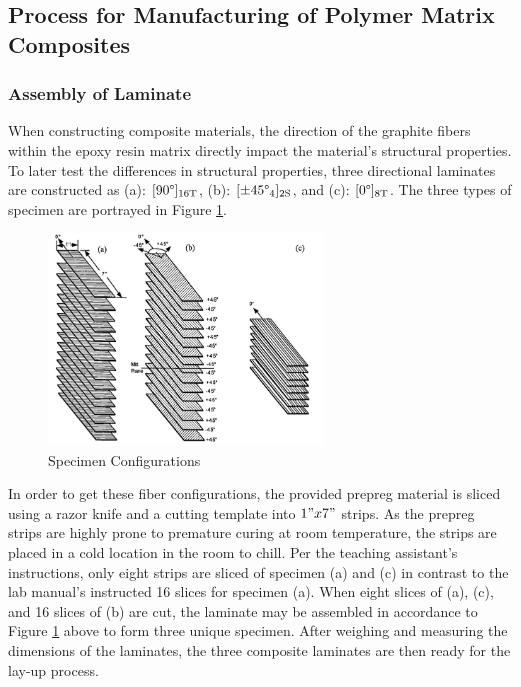 \subsection{Process for Manufacturing of Polymer Matrix Composites}
\subsubsection{Assembly of Laminate}
When constructing composite materials, the direction of the graphite fibers within the epoxy resin matrix directly impact the material's structural properties.  To later test the differences in structural properties, three directional laminates are constructed as (a): $[90\degree]_{16\text{T}}$, (b): $[\pm45\degree_4]_{2\text{S}}$, and (c): $[0\degree]_{8\text{T}}$.  The three types of specimen are portrayed in Figure \ref{fig:specconfig}.

\begin{figure}[!h]
    \centering
    \includegraphics[width=0.65\textwidth]{Pictures/Procedure/specconfig.png}
    \caption{Specimen Configurations\cite{labmanual}}
    \label{fig:specconfig}
\end{figure}

In order to get these fiber configurations, the provided prepreg material is sliced using a razor knife and a cutting template into $1" x 7"$ strips.  As the prepreg strips are highly prone to premature curing at room temperature, the strips are placed in a cold location in the room to chill.  Per the teaching assistant's instructions, only eight strips are sliced of specimen (a) and (c) in contrast to the lab manual's instructed 16 slices for specimen (a).  When eight slices of (a), (c), and 16 slices of (b) are cut, the laminate may be assembled in accordance to Figure \ref{fig:specconfig} above to form three unique specimen.  After weighing and measuring the dimensions of the laminates, the three composite laminates are then ready for the lay-up process.


